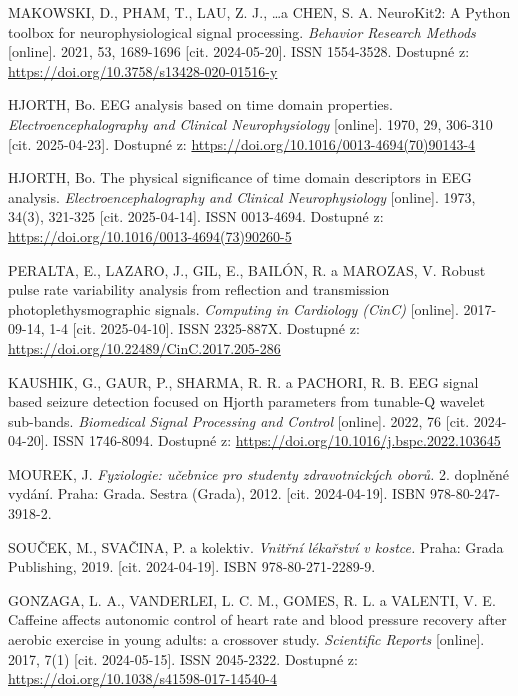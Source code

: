 \begin{thebibliography}{99}
		MAKOWSKI, D., PHAM, T., LAU, Z. J., \dots a CHEN, S. A.
		NeuroKit2: A Python toolbox for neurophysiological signal processing.
		\emph{Behavior Research Methods} [online].
		2021, 53, 1689-1696 [cit. 2024-05-20].
		ISSN 1554-3528.
		Dostupné z: \url{https://doi.org/10.3758/s13428-020-01516-y}

		HJORTH, Bo.
		EEG analysis based on time domain properties.
		\emph{Electroencephalography and Clinical Neurophysiology} [online].
		1970, 29, 306-310 [cit. 2025-04-23].
		Dostupné z: \url{https://doi.org/10.1016/0013-4694(70)90143-4}

		HJORTH, Bo.
		The physical significance of time domain descriptors in EEG analysis.
		\emph{Electroencephalography and Clinical Neurophysiology} [online].
		1973, 34(3), 321-325 [cit. 2025-04-14].
		ISSN 0013-4694.
		Dostupné z: \url{https://doi.org/10.1016/0013-4694(73)90260-5}

		PERALTA, E., LAZARO, J., GIL, E., BAILÓN, R. a MAROZAS, V.
		Robust pulse rate variability analysis from reflection and transmission photoplethysmographic signals.
		\emph{Computing in Cardiology (CinC)} [online].
		2017-09-14, 1-4 [cit. 2025-04-10].
		ISSN 2325-887X.
		Dostupné z: \url{https://doi.org/10.22489/CinC.2017.205-286}

		KAUSHIK, G., GAUR, P., SHARMA, R. R. a PACHORI, R. B.
		EEG signal based seizure detection focused on Hjorth parameters from tunable-Q wavelet sub-bands.
		\emph{Biomedical Signal Processing and Control} [online].
		2022, 76 [cit. 2024-04-20].
		ISSN 1746-8094.
		Dostupné z: \url{https://doi.org/10.1016/j.bspc.2022.103645}

		MOUREK, J.
		\emph{Fyziologie: učebnice pro studenty zdravotnických oborů.}
		2. doplněné vydání. Praha: Grada. Sestra (Grada), 2012. [cit. 2024-04-19].
		ISBN 978-80-247-3918-2.

		SOUČEK, M., SVAČINA, P. a kolektiv.
		\emph{Vnitřní lékařství v kostce.}
		Praha: Grada Publishing, 2019. [cit. 2024-04-19].
		ISBN 978-80-271-2289-9.

		GONZAGA, L. A., VANDERLEI, L. C. M., GOMES, R. L. a VALENTI, V. E.
		Caffeine affects autonomic control of heart rate and blood pressure recovery after aerobic exercise in young adults: a crossover study.
		\emph{Scientific Reports} [online].
		2017, 7(1) [cit. 2024-05-15].
		ISSN 2045-2322.
		Dostupné z: \url{https://doi.org/10.1038/s41598-017-14540-4}


\end{thebibliography}
